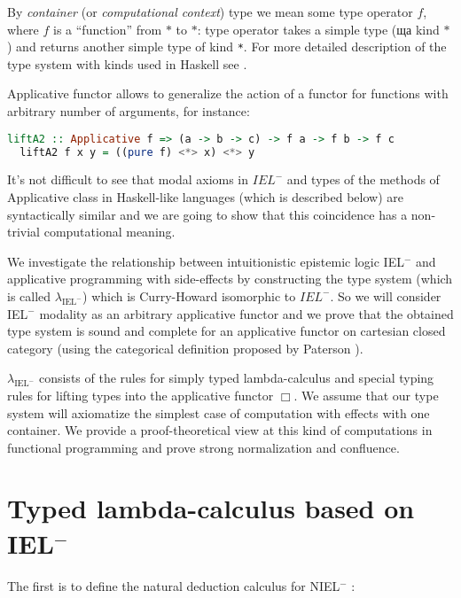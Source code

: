 \documentclass[a4paper]{article}
\begin{document}
  By \emph{container} (or \emph{computational context}) type we mean some type operator $f$, where $f$ is a
  ``function'' from $*$ to $*$: type operator takes a simple type (ща kind $*$) and returns another
  simple type of kind \verb"*". For more detailed description of the type system with kinds used in
  Haskell see \cite{Morten}.

Applicative functor allows to generalize the action of a functor for functions with arbitrary number of arguments, for instance:
  \begin{lstlisting}[language=Haskell]
  liftA2 :: Applicative f => (a -> b -> c) -> f a -> f b -> f c
  liftA2 f x y = ((pure f) <*> x) <*> y
  \end{lstlisting}

  It's not difficult to see that modal axioms in $IEL^{-}$ and types of the methods of Applicative class in
  Haskell-like languages (which is described below) are syntactically similar and we are going to show that
  this coincidence has a non-trivial computational meaning.

  We investigate the relationship between intuitionistic epistemic logic IEL$^{-}$ and applicative programming with side-effects
  by constructing the type system (which is called $\lambda_{\text{IEL}^{-}}$) which is Curry-Howard isomorphic to $IEL^{-}$.
  So we will consider IEL$^{-}$ modality as an arbitrary applicative functor and we prove that the obtained type system
  is sound and complete for an applicative functor on cartesian closed category
  (using the categorical definition proposed by Paterson \cite{Cons}).

  $\lambda_{\text{IEL}^{-}}$ consists of the rules for simply typed lambda-calculus and special typing rules for
  lifting types into the applicative functor $\Box$. We assume that our type system will
  axiomatize the simplest case of computation with effects with one container. We provide a proof-theoretical
  view at this kind of computations in functional programming and prove strong normalization and confluence.

  \section{Typed lambda-calculus based on IEL$^{-}$}

  The first is to define the natural deduction calculus for NIEL$^{-}$ :
\end{document}

